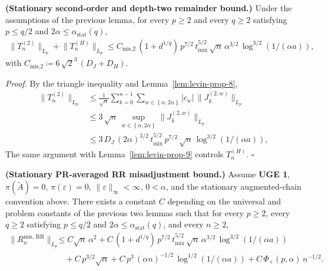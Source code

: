 \begin{lemma}\label{lem:T2H-bound}
  \textbf{(Stationary second-order and depth-two remainder bound.)}
  Under the assumptions of the previous lemma, for every \(p \ge 2\) and every
  \(q \ge 2\) satisfying \(p \le q / 2\) and
  \(2 \alpha \le \alpha_{\text{stat}}(q)\),
\begin{equation}
\begin{aligned}
  \lVert  T_n^{(2)}  \rVert_{L_p} + \lVert  T_n^{(H)}  \rVert_{L_p}
    \le C_{\text{mis,2}} \, (1 + d^{1 / q}) \, p^{7 / 2} \, t_{\text{mix}}^{5 / 2}
       \, \sqrt{n} \, \alpha^{3 / 2} \, \log^{3 / 2}(1 / (\alpha a)),
\end{aligned}
\end{equation}
  with \(C_{\text{mis,2}} \coloneqq 6 \, \sqrt{2}^3 \, (D_J + D_H)\).
\end{lemma}

\textit{Proof.} By the triangle inequality and Lemma~\ref{lem:levin-prop-8},
\begin{equation}
\begin{aligned}
\lVert  T_n^{(2)}  \rVert_{L_p}
  &\le \frac{1}{\sqrt{n}} \sum_{k = 0}^{n - 1} \sum_{w \in \left\{\alpha, 2 \alpha\right\}} |c_w| \, \lVert  J_k^{(2, w)}  \rVert_{L_p} \\
  &\le 3 \, \sqrt{n} \, \sup_{w \in \left\{\alpha, 2 \alpha\right\}} \lVert  J_k^{(2, w)}  \rVert_{L_p} \\
  &\le 3 \, D_J \, (2 \alpha)^{3 / 2}
      \, t_{\text{mix}}^{5 / 2} \, p^{7 / 2} \, \sqrt{n}
      \, \log^{3 / 2}(1 / (\alpha a)),
\end{aligned}
\end{equation}
The same argument with Lemma~\ref{lem:levin-prop-9} controls \(T_n^{(H)}\). \(\square\)

\begin{theorem}\label{thm:misadjustment}
  \textbf{(Stationary PR-averaged RR misadjustment bound.)}
  Assume \textbf{UGE 1}, \(\pi(\widetilde{A}) = 0\), \(\pi(\varepsilon) = 0\),
  \(\lVert  \varepsilon  \rVert_\infty < \infty\), \(0 < \alpha\), and
  the stationary augmented-chain convention above. There exists a constant \(C\)
  depending on the universal and problem constants of the previous two lemmas
  such that for every
  \(p \ge 2\), every \(q \ge 2\) satisfying
  \(p \le q / 2\) and \(2 \alpha \le \alpha_{\text{stat}}(q)\), and every \(n \ge 2\),
\begin{equation}
\begin{aligned}
  \lVert  R_n^{\text{mis, RR}}  \rVert_{L_p}
    &\le C \sqrt{n} \, \alpha^2
     + C \, (1 + d^{1 / q}) \, p^{7 / 2} \, t_{\text{mix}}^{5 / 2}
         \, \sqrt{n} \, \alpha^{3 / 2} \, \log^{3 / 2}(1 / (\alpha a)) \\
    &\quad + C \, p^{3 / 2} \sqrt{\alpha}
     + C \, p^3 \, (\alpha n)^{-1 / 2} \, \log^{1 / 2}(1 / (\alpha a))
     + C \, \Phi_+(p, \alpha) \, n^{-1 / 2}.
\end{aligned}
\end{equation}
\end{theorem}

